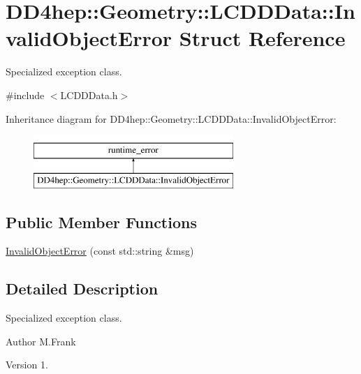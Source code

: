 \hypertarget{struct_d_d4hep_1_1_geometry_1_1_l_c_d_d_data_1_1_invalid_object_error}{}\section{D\+D4hep\+:\+:Geometry\+:\+:L\+C\+D\+D\+Data\+:\+:Invalid\+Object\+Error Struct Reference}
\label{struct_d_d4hep_1_1_geometry_1_1_l_c_d_d_data_1_1_invalid_object_error}


Specialized exception class.  




{\ttfamily \#include $<$L\+C\+D\+D\+Data.\+h$>$}

Inheritance diagram for D\+D4hep\+:\+:Geometry\+:\+:L\+C\+D\+D\+Data\+:\+:Invalid\+Object\+Error\+:\begin{figure}[H]
\begin{center}
\leavevmode
\includegraphics[height=2.000000cm]{struct_d_d4hep_1_1_geometry_1_1_l_c_d_d_data_1_1_invalid_object_error}
\end{center}
\end{figure}
\subsection*{Public Member Functions}
\begin{DoxyCompactItemize}
\item 
\hyperlink{struct_d_d4hep_1_1_geometry_1_1_l_c_d_d_data_1_1_invalid_object_error_aaca6af4a0b1d636f7af31f3191f1d998}{Invalid\+Object\+Error} (const std\+::string \&msg)
\end{DoxyCompactItemize}


\subsection{Detailed Description}
Specialized exception class. 

\begin{DoxyAuthor}{Author}
M.\+Frank 
\end{DoxyAuthor}
\begin{DoxyVersion}{Version}
1. 
\end{DoxyVersion}


